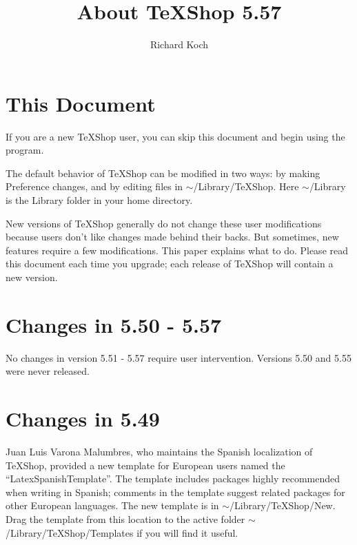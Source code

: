 \documentclass[11pt, oneside]{amsart}
\title{About TeXShop 5.57}
\author{Richard Koch}
\begin{document}
\maketitle

\thispagestyle{empty}
\vspace{-.3in}
\section{This Document}

If you are a new TeXShop user, you can skip this document and begin using the program.

The default behavior of TeXShop can be modified in two ways: by making Preference changes, and by editing files in $\sim$/Library/TeXShop. Here $\sim$/Library is the Library folder in your home directory. 

New versions of TeXShop generally do not change these user modifications because users don't like changes made behind their backs. But sometimes, new features require a few modifications. This paper explains what to do.
Please read this document each time you upgrade; each release of TeXShop will contain a new version.

\section{Changes in 5.50 - 5.57}

No changes in version 5.51 - 5.57 require user intervention. Versions 5.50 and 5.55 were never released.  

\section{Changes in 5.49}

Juan Luis Varona Malumbres, who maintains the Spanish localization of TeXShop, provided a new template for European users named the ``LatexSpanishTemplate''. The template includes packages highly recommended when writing in Spanish; comments in the template suggest related packages for other European languages. The new template is in $\sim$/Library/TeXShop/New. Drag the template from this location to the active folder $\sim$/Library/TeXShop/Templates if you will find it useful.
\end{document}
